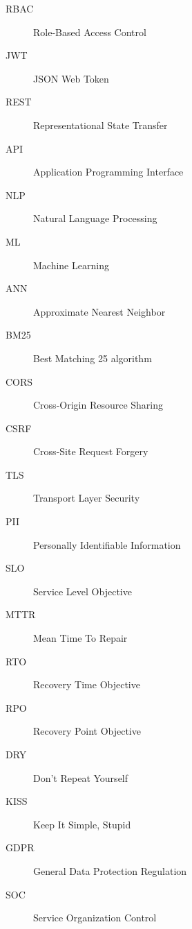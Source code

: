 \documentclass[12pt,a4paper]{report}
\begin{document}
\begin{description}
    \item[RBAC] Role-Based Access Control
    \item[JWT] JSON Web Token
    \item[REST] Representational State Transfer
    \item[API] Application Programming Interface
    \item[NLP] Natural Language Processing
    \item[ML] Machine Learning
    \item[ANN] Approximate Nearest Neighbor
    \item[BM25] Best Matching 25 algorithm
    \item[CORS] Cross-Origin Resource Sharing
    \item[CSRF] Cross-Site Request Forgery
    \item[TLS] Transport Layer Security
    \item[PII] Personally Identifiable Information
    \item[SLO] Service Level Objective
    \item[MTTR] Mean Time To Repair
    \item[RTO] Recovery Time Objective
    \item[RPO] Recovery Point Objective
    \item[DRY] Don't Repeat Yourself
    \item[KISS] Keep It Simple, Stupid
    \item[GDPR] General Data Protection Regulation
    \item[SOC] Service Organization Control
\end{description}

\end{document}
